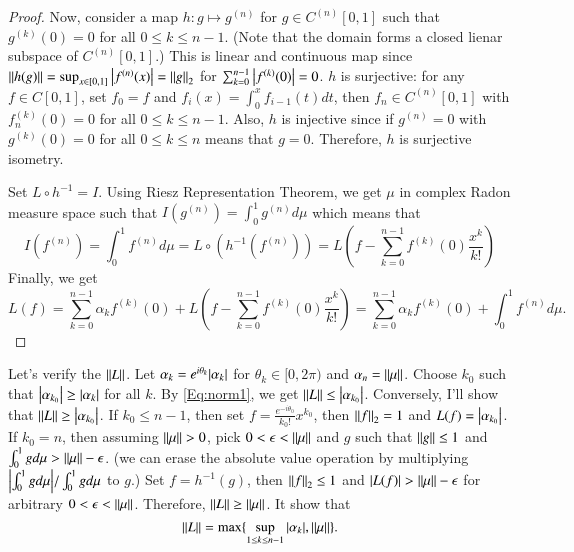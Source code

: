 \documentclass[a4paper, 12pt]{article}
\theoremstyle{Mydefinition}
\theoremstyle{Mytheorem}
\begin{document}
\begin{proof}
Now, consider a map $h: g\mapsto g^{(n)}$ for $g\in C^{(n)}[0,1]$ such that $g^{(k)}(0) = 0$ for all $0\leq k\leq n-1$. (Note that the domain forms a closed lienar subspace of $C^{(n)}[0,1]$.) This is linear and continuous map since $\norm{h(g)} = \sup_{x\in [0,1]}\abs{f^{(n)}(x)} = \norm{g}_2$ for $\sum_{k=0}^{n-1}\abs{f^{(k)}(0)} = 0$. $h$ is surjective: for any $f\in C[0,1]$, set $f_0 = f$ and $f_i(x) = \int_0^x f_{i-1}(t)dt$, then $f_n\in C^{(n)}[0,1]$ with $f_n^{(k)}(0) = 0$ for all $0\leq k\leq n-1$. Also, $h$ is injective since if $g^{(n)} = 0$ with $g^{(k)}(0) = 0$ for all $0\leq k\leq n$ means that $g=0$. Therefore, $h$ is surjective isometry.

Set $L\circ h^{-1} = I$. Using Riesz Representation Theorem, we get $\mu$ in complex Radon measure space such that $I(g^{(n)}) = \int_0^1 g^{(n)} d\mu$ which means that 
\begin{equation}
    I\left(f^{(n)}\right) = \int_0^1 f^{(n)} d\mu = L\circ \left(h^{-1}(f^{(n)})\right) = L\left(f - \sum_{k=0}^{n-1}f^{(k)}(0)\frac{x^k}{k!}\right)
\end{equation}
Finally, we get
\begin{equation}
    L(f) = \sum_{k=0}^{n-1}\alpha_k f^{(k)}(0) + L\left(f - \sum_{k=0}^{n-1}f^{(k)}(0)\frac{x^k}{k!}\right)=\sum_{k=0}^{n-1}\alpha_k f^{(k)}(0) + \int_0^1 f^{(n)}d\mu.
\end{equation}
\end{proof}

Let's verify the $\norm{L}$. Let $\alpha_k = e^{i\theta_k}\abs{\alpha_k}$ for $\theta_k\in [0,2\pi)$ and $\alpha_{n} = \norm{\mu}$. Choose $k_0$ such that $\abs{\alpha_{k_0}}\geq \abs{\alpha_k}$ for all $k$. By \eqref{Eq:norm1}, we get $\norm{L}\leq \abs{\alpha_{k_0}}$. Conversely, I'll show that $\norm{L}\geq \abs{\alpha_{k_0}}$. If $k_0\leq n-1$, then set $f = \frac{e^{-i\theta_0}}{k_0!}x^{k_0}$, then $\norm{f}_2 = 1$ and $L(f) = \abs{\alpha_{k_0}}$. If $k_0 = n$, then assuming $\norm{\mu}>0$, pick $0<\epsilon<\norm{\mu}$ and $g$ such that $\norm{g}\leq 1$ and $\int_0^1 gd\mu > \norm{\mu}-\epsilon$. (we can erase the absolute value operation by multiplying $\abs{\int_0^1 gd\mu}/\int_0^1 gd\mu$ to $g$.) Set $f = h^{-1}(g)$, then $\norm{f}_2\leq 1$ and $\abs{L(f)}>\norm{\mu}-\epsilon$ for arbitrary $0<\epsilon<\norm{\mu}$. Therefore, $\norm{L} \geq \norm{\mu}$. It show that
\begin{equation}
    \norm{L} = \max\{\sup_{1\leq k\leq n-1}\abs{\alpha_k}, \norm{\mu}\}.
\end{equation}
\end{document}
